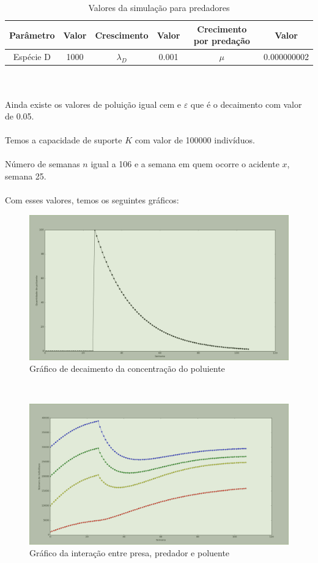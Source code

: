 \documentclass[a4paper]{article}
\begin{document}
\\
\\
\begin{table}[ht!]
\centering
\caption{Valores da simula\c{c}\~ao para predadores}
\begin{tabular}{|c|c|c|c|c|c|}
Par\^ametro & Valor & Crescimento & Valor & Crecimento por preda\c{c}\~ao & Valor\\
\hline
Esp\'ecie D & 1000   & $\lambda_D$ & 0.001 & $\mu$ & 0.000000002 
\end{tabular}
\end{table}
\\
\\
Ainda existe os valores de polui\c{c}\~ao igual cem e $\varepsilon$  que \'e o decaimento com valor de 0.05.
\\
\\
Temos a capacidade de suporte $K$ com valor de 100000 indiv\'iduos.
\\
\\
N\'umero de semanas $n$ igual a 106 e a semana em quem ocorre o acidente $x$, semana 25.
\\
\\
Com esses valores, temos os seguintes gr\'aficos:
\\
\begin{figure}[!htb]
\centering
\caption{Gr\'afico de decaimento da concentra\c{c}\~ao do poluiente}
\includegraphics[scale=0.25]{graf_poluicao.png}
\end{figure}
\\
\begin{figure}[!htb]
\centering
\caption{Gr\'afico da intera\c{c}\~ao entre presa, predador e poluente}
\includegraphics[scale=0.25]{graf_iteracao.png}
\end{figure}
\end{document}
